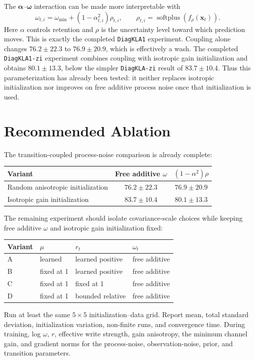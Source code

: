 \documentclass[11pt]{article}
\newcommand{\vct}[1]{\boldsymbol{#1}}
\begin{document}
The $\vct{\alpha}$--$\vct{\omega}$ interaction can be made more interpretable with
\begin{equation}
  \omega_{t,i}
  = \omega_{\min}+(1-\alpha_{t,i}^2)\rho_{t,i},
  \qquad
  \rho_{t,i}=\operatorname{softplus}(f_\rho(\vct{x}_t)).
\end{equation}
Here $\alpha$ controls retention and $\rho$ is the uncertainty level toward which prediction
moves. This is exactly the completed \texttt{DiagKLA1} experiment. Coupling alone changes
$76.2\pm22.3$ to $76.9\pm20.9$, which is effectively a wash. The completed
\texttt{DiagKLA1-zi} experiment combines coupling with isotropic gain initialization and obtains
$80.1\pm13.3$, below the simpler \texttt{DiagKLA-zi} result of $83.7\pm10.4$. Thus this
parameterization has already been tested: it neither replaces isotropic initialization nor
improves on free additive process noise once that initialization is used.

\section{Recommended Ablation}

The transition-coupled process-noise comparison is already complete:
\begin{center}
\begin{tabular}{lcc}
\toprule
Variant & Free additive $\omega$ & $(1-\alpha^2)\rho$ \\
\midrule
Random anisotropic initialization & $76.2\pm22.3$ & $76.9\pm20.9$ \\
Isotropic gain initialization & $83.7\pm10.4$ & $80.1\pm13.3$ \\
\bottomrule
\end{tabular}
\end{center}
The remaining experiment should isolate covariance-scale choices while keeping free additive
$\omega$ and isotropic gain initialization fixed:
\begin{center}
\begin{tabular}{llll}
\toprule
Variant & $\mu$ & $r_t$ & $\omega_t$ \\
\midrule
A & learned & learned positive & free additive \\
B & fixed at 1 & learned positive & free additive \\
C & fixed at 1 & fixed at 1 & free additive \\
D & fixed at 1 & bounded relative & free additive \\
\bottomrule
\end{tabular}
\end{center}
Run at least the same $5\times5$ initialization--data grid. Report mean, total standard
deviation, initialization variation, non-finite runs, and convergence time. During training,
log $\omega$, $r$, effective write strength, gain anisotropy, the minimum channel gain, and
gradient norms for the process-noise, observation-noise, prior, and transition parameters.
\end{document}
